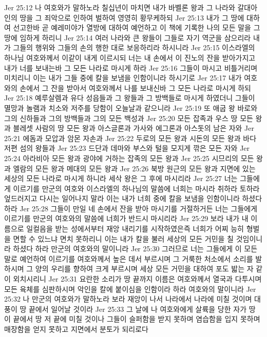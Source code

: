 Jer 25:12  나 여호와가 말하노라 칠십년이 마치면 내가 바벨론 왕과 그 나라와 갈대아인의 땅을 그 죄악으로 인하여 벌하여 영영히 황무케하되
Jer 25:13  내가 그 땅에 대하여 선고한바 곧 예레미야가 열방에 대하여 예언하고 이 책에 기록한 나의 모든 말을 그 땅에 임하게 하리니
Jer 25:14  여러 나라와 큰 왕들이 그들로 자기 역군을 삼으리라 내가 그들의 행위와 그들의 손의 행한 대로 보응하리라 하시니라
Jer 25:15  이스라엘의 하나님 여호와께서 이같이 내게 이르시되 너는 내 손에서 이 진노의 잔을 받아가지고 내가 너를 보내는바 그 모든 나라로 마시게 하라
Jer 25:16  그들이 마시고 비틀거리며 미치리니 이는 내가 그들 중에 칼을 보냄을 인함이니라 하시기로
Jer 25:17  내가 여호와의 손에서 그 잔을 받아서 여호와께서 나를 보내신바 그 모든 나라로 마시게 하되
Jer 25:18  예루살렘과 유다 성읍들과 그 왕들과 그 방백들로 마시게 하였더니 그들이 멸망과 놀램과 치소와 저주를 당함이 오늘날과 같으니라
Jer 25:19  또 애굽 왕 바로와 그의 신하들과 그의 방백들과 그의 모든 백성과
Jer 25:20  모든 잡족과 우스 땅 모든 왕과 블레셋 사람의 땅 모든 왕과 아스글론과 가사와 에그론과 아스돗의 남은 자와
Jer 25:21  에돔과 모압과 암몬 자손과
Jer 25:22  두로의 모든 왕과 시돈의 모든 왕과 바다 저편 섬의 왕들과
Jer 25:23  드단과 데마와 부스와 털을 모지게 깎은 모든 자와
Jer 25:24  아라비아 모든 왕과 광야에 거하는 잡족의 모든 왕과
Jer 25:25  시므리의 모든 왕과 엘람의 모든 왕과 메대의 모든 왕과
Jer 25:26  북방 원근의 모든 왕과 지면에 있는 세상의 모든 나라로 마시게 하니라 세삭 왕은 그 후에 마시리라
Jer 25:27  너는 그들에게 이르기를 만군의 여호와 이스라엘의 하나님의 말씀에 너희는 마시라 취하라 토하라 엎드러지고 다시는 일어나지 말라 이는 내가 너희 중에 칼을 보냄을 인함이니라 하셨다 하라
Jer 25:28  그들이 만일 네 손에서 잔을 받아 마시기를 거절하거든 너는 그들에게 이르기를 만군의 여호와의 말씀에 너희가 반드시 마시리라
Jer 25:29  보라 내가 내 이름으로 일컬음을 받는 성에서부터 재앙 내리기를 시작하였은즉 너희가 어찌 능히 형벌을 면할 수 있느냐 면치 못하리니 이는 내가 칼을 불러 세상의 모든 거민을 칠 것임이니라 하셨다 하라 만군의 여호와의 말이니라
Jer 25:30  그러므로 너는 그들에게 이 모든 말로 예언하여 이르기를 여호와께서 높은 데서 부르시며 그 거룩한 처소에서 소리를 발하시며 그 양의 우리를 향하여 크게 부르시며 세상 모든 거민을 대하여 포도 밟는 자 같이 외치시리니
Jer 25:31  요란한 소리가 땅 끝까지 이름은 여호와께서 열국과 다투시며 모든 육체를 심판하시며 악인을 칼에 붙이심을 인함이라 하라 여호와의 말이니라
Jer 25:32  나 만군의 여호와가 말하노라 보라 재앙이 나서 나라에서 나라에 미칠 것이며 대풍이 땅 끝에서 일어날 것이라
Jer 25:33  그 날에 나 여호와에게 살륙을 당한 자가 땅 이 끝에서 땅 저 끝에 미칠 것이나 그들이 슬퍼함을 받지 못하며 염습함을 입지 못하며 매장함을 얻지 못하고 지면에서 분토가 되리로다
